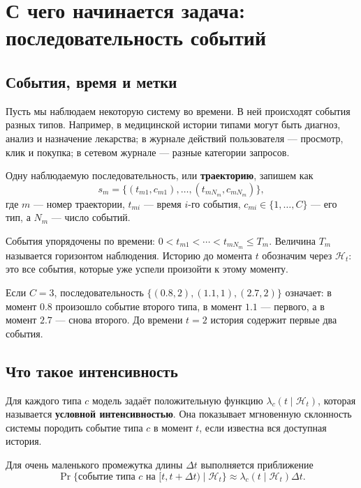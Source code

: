 \documentclass[12pt,a4paper]{article}
\newcommand{\History}{\mathcal{H}}
\newenvironment{examplebox}{\par\medskip\noindent{\color{orange}\bfseries Численный пример. }\ignorespaces}{\par\medskip}
\newcommand{\term}[1]{\textbf{#1}}
\begin{document}
\section{С чего начинается задача: последовательность событий}

\subsection{События, время и метки}

Пусть мы наблюдаем некоторую систему во времени. В ней происходят события разных типов. Например, в медицинской истории типами могут быть диагноз, анализ и назначение лекарства; в журнале действий пользователя --- просмотр, клик и покупка; в сетевом журнале --- разные категории запросов.

Одну наблюдаемую последовательность, или \term{траекторию}, запишем как
\begin{equation}
s_m=\bigl\{(t_{m1},c_{m1}),\ldots,(t_{mN_m},c_{mN_m})\bigr\},
\end{equation}
где \(m\) --- номер траектории, \(t_{mi}\) --- время \(i\)-го события, \(c_{mi}\in\{1,\ldots,C\}\) --- его тип, а \(N_m\) --- число событий.

События упорядочены по времени: \(0<t_{m1}<\cdots<t_{mN_m}\leq T_m\). Величина \(T_m\) называется горизонтом наблюдения. Историю до момента \(t\) обозначим через \(\History_t\): это все события, которые уже успели произойти к этому моменту.

\begin{examplebox}
Если \(C=3\), последовательность \(\{(0.8,2),(1.1,1),(2.7,2)\}\) означает: в момент \(0.8\) произошло событие второго типа, в момент \(1.1\) --- первого, а в момент \(2.7\) --- снова второго. До времени \(t=2\) история содержит первые два события.
\end{examplebox}

\subsection{Что такое интенсивность}

Для каждого типа \(c\) модель задаёт положительную функцию \(\lambda_c(t\mid\History_t)\), которая называется \term{условной интенсивностью}. Она показывает мгновенную склонность системы породить событие типа \(c\) в момент \(t\), если известна вся доступная история.

Для очень маленького промежутка длины \(\Delta t\) выполняется приближение
\begin{equation}
\Pr\{\text{событие типа }c\text{ на }[t,t+\Delta t)\mid\History_t\}\approx \lambda_c(t\mid\History_t)\Delta t.
\end{equation}
\end{document}
